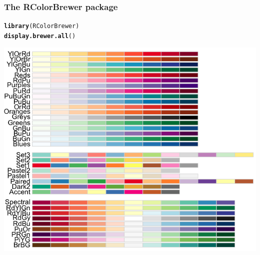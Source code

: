 \documentclass{beamer}\usepackage[]{graphicx}\usepackage[]{color}
\makeatletter
\newcommand{\hlstd}[1]{\textcolor[rgb]{0.345,0.345,0.345}{#1}}%
\newcommand{\hlkwd}[1]{\textcolor[rgb]{0.737,0.353,0.396}{\textbf{#1}}}%
\newenvironment{kframe}{%
 \def\at@end@of@kframe{}%
 \ifinner\ifhmode%
  \def\at@end@of@kframe{\end{minipage}}%
  \begin{minipage}{\columnwidth}%
 \fi\fi%
 \def\FrameCommand##1{\hskip\@totalleftmargin \hskip-\fboxsep
 \colorbox{shadecolor}{##1}\hskip-\fboxsep
     \hskip-\linewidth \hskip-\@totalleftmargin \hskip\columnwidth}%
 \MakeFramed {\advance\hsize-\width
   \@totalleftmargin\z@ \linewidth\hsize
   \@setminipage}}%
 {\par\unskip\endMakeFramed%
 \at@end@of@kframe}
\newenvironment{knitrout}{}{} %
\makeatother
\begin{document}
\begin{frame}[fragile]
\frametitle{The RColorBrewer package}
\begin{knitrout}\footnotesize
{}\color{fgcolor}\begin{kframe}
\begin{alltt}
\hlkwd{library}\hlstd{(RColorBrewer)}
\hlkwd{display.brewer.all}\hlstd{()}
\end{alltt}
\end{kframe}
\end{knitrout}

\begin{center}
\includegraphics[scale=0.25]{images/color_palette.png}
\end{center}
\end{frame}

\end{document}
